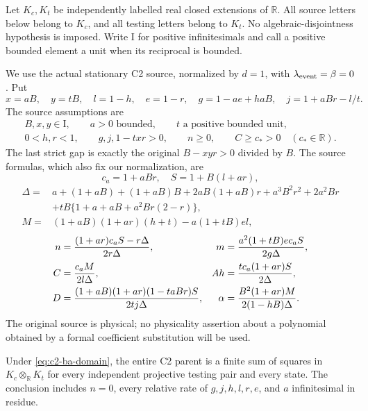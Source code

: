 Let $K_c,K_t$ be independently labelled real closed extensions of
$\mathbb R$. All source letters below belong to $K_c$, and all testing
letters belong to $K_t$. No algebraic-disjointness hypothesis is imposed.
Write $\mathrm I$ for positive infinitesimals and call a positive bounded
element a unit when its reciprocal is bounded.

We use the actual stationary C2 source, normalized by $d=1$, with
$\lambda_{\rm event}=\beta=0$. Put
\[
 x=aB,\quad y=tB,\quad l=1-h,\quad e=1-r,\quad
 g=1-ae+haB,\quad j=1+aBr-l/t.
\]
The source assumptions are
\begin{equation}
 \begin{gathered}
 B,x,y\in\mathrm I,\qquad a>0\text{ bounded},\qquad
 t\text{ a positive bounded unit},\\
 0<h,r<1,\qquad g,j,1-txr>0,\qquad n\ge0,\qquad
 C\ge c_*>0\quad(c_*\in\mathbb R).
 \end{gathered}
 \label{eq:c2-ba-domain}
\end{equation}
The last strict gap is exactly the original $B-xyr>0$ divided by $B$.
The source formulas, which also fix our normalization, are
\[
 c_a=1+aBr,\quad S=1+B(l+ar),
\]
\[
 \begin{split}
 \Delta={}&a+(1+aB)+(1+aB)B+2aB(1+aB)r+a^3B^2r^2+2a^2Br\\
 &+tB\{1+a+aB+a^2Br(2-r)\},\\
 M={}&(1+aB)(1+ar)(h+t)-a(1+tB)el,
 \end{split}
\]
\begin{equation}
 \begin{aligned}
 n&={ (1+ar)c_aS-r\Delta\over2r\Delta},&
 m&={a^2(1+tB)e c_aS\over2g\Delta},\\
 C&={c_aM\over2l\Delta},&
 Ah&={t c_a(1+ar)S\over2\Delta},\\
 D&={(1+aB)(1+ar)(1-taBr)S\over2t j\Delta},&
 \alpha&={B^2(1+ar)M\over2(1-hB)\Delta}.
 \end{aligned}
 \label{eq:c2-ba-source}
\end{equation}
The original source is physical; no physicality assertion about a
polynomial obtained by a formal coefficient substitution will be used.

\begin{proposition}
\label{prop:c2-bounded-a}
Under \eqref{eq:c2-ba-domain}, the entire C2 parent is a finite sum of
squares in $K_c\otimes_{\mathbb R}K_t$ for every independent projective
testing pair and every state. The conclusion includes $n=0$, every
relative rate of $g,j,h,l,r,e$, and $a$ infinitesimal in residue.
\end{proposition}

